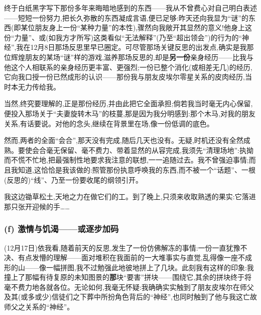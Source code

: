 终于白纸黑字写下那份多年来晦暗地感到的东西——我从不曾费心对自己明白表述——短短一份努力,把长久弥散的东西凝成言语,便已足够:昨天还向我显为“谜”的东西(即某位朋友身上一份“某种力量”的本性),骤然向我敞开其显然的意义!他身上这份“力量”、或(如我方才所写)这类看似“无法解释”(乃至“超出领会”)的行为的“神经”,我在12月8日那场反思里早已圈定。可尽管那场关键反思的出发点,确实是我那位辉煌朋友的某场“谜”样的游戏,滋养那场反思的,却是\textbf{另一份}亲身经历——比我与他这个人相联系的亲身经历更丰富、更强烈;一份已整个消化(或相差无几)的经历,它向我口授一份已然成形的认识——那份我与朋友皮埃尔零星关系的皮肉经历,当时本无力传给我。

当然,终究要理解的,正是那份经历,并由此把它全面承担;倘若我当时毫无内心保留,便投入那场关于“夫妻旋转木马”的枝蔓,那是因为我分明感到:那个木马,对我的朋友关系,有话要说。对他的念头,继续在背景里在场,像一份低调的底色。

然而,两者的全面“会合”,那天没有完成,随后几天也没有。无疑,时机还没有全然成熟。要使会合毫无保留、毫不费力、带着显然的从容完成,我须先“清理场地”:执拗而不慌不忙地,把最强制性地要求我注意的联想,一一追随过去。我不曾强迫事情;而且我知道,这恰恰是我该做的:照管那份执意呼唤我的东西,而不被一个“话题”、一根(反思的)“线”、乃至一份要收尾的纲领引开。

我这边锄草松土,天地之力在做它们的工。到了晚上,只须来收取熟透的果实:它落进那只张开迎候的手……

\subsubsection*{(f) 激情与饥渴——或逐步加码}
\label{ch18:local:h59}

\label{ch18:local:n54}

\dmark{}(12月17日)依我看,随着前天的反思,发生了一份仿佛解冻的事情:一份一直犹豫不决、有点发懵的理解——面对堆积在我面前的一大堆事实与直觉,乱得像一座不成形的山——像一幅拼图,我不过勉强此地彼地拼上了几块。此刻我有这样的印象:我撞上了那幅有待复原的未知图景的\textbf{那}块“要害”拼块——围绕它,其余的拼块终于将毫不费力地各就各位。无论如何,我毫无怀疑:我确确实实触到了朋友皮埃尔在师父及其(或多或少)信徒们之下葬中所扮角色背后的“神经”,也同时触到了他与我这亡故师父之关系的“神经”。

